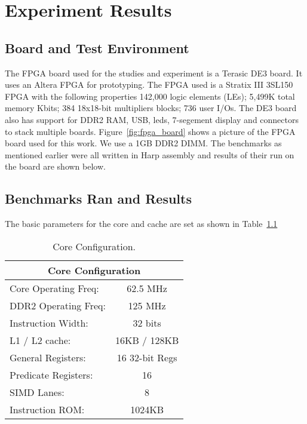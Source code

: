 \setcounter{equation}{0}
 
\chapter{Experiment Results }
\label{chap: Simulation Results }
\section{Board and Test Environment}

The FPGA board used for the studies and experiment is a Terasic DE3 board. It uses an Altera FPGA for prototyping. The FPGA used is a Stratix III 3SL150 FPGA with the following properties 142,000 logic elements (LEs); 5,499K total memory Kbits; 384 18x18-bit multipliers blocks; 736 user I/Os. The DE3 board also has support for DDR2 RAM, USB, leds, 7-segement display and connectors to stack multiple boards. Figure~\ref{fig:fpga_board} shows a picture of the FPGA board used for this work. We use a 1GB DDR2 DIMM. The benchmarks as mentioned earlier were all written in Harp assembly and results of their run on the board are shown below.

\section{Benchmarks Ran and Results}

The basic parameters for the core and cache are set as shown in Table~\ref{table:core_config}
\begin{table}[!htbp]
  \centering
  \begin{tabular}{|l|c|}
    \hline
    \multicolumn{2}{|c|}{Core Configuration} \\
    \hline
Core Operating Freq:			&62.5 MHz\\
DDR2 Operating Freq:			&125 MHz\\
Instruction Width:			&32 bits\\
L1 / L2 cache:				& 16KB / 128KB\\
General Registers:			& 16 32-bit Regs\\
Predicate Registers:			& 16\\
SIMD Lanes:				& 8\\
Instruction ROM:			& 1024KB\\
    \hline
  \end{tabular}
  \caption{Core Configuration.}
  \label{table:core_config}
\end{table}

